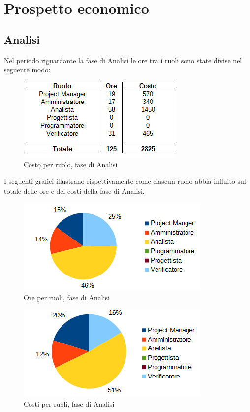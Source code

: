 \section{Prospetto economico}
	\subsection{Analisi}
	Nel periodo riguardante la fase di Analisi le ore tra i ruoli sono state divise nel seguente modo: \\
	\begin{figure}[H]
		\centering
		\includegraphics[scale=0.75]{immagini/tabelle/analisi-costo.png}
		\caption{Costo per ruolo, fase di Analisi}
	\end{figure}
	I seguenti grafici illustrano rispettivamente come ciascun ruolo abbia influito sul totale
delle ore e dei costi della fase di Analisi. \\
	\begin{figure}[H]
		\centering
		\includegraphics[scale=1]{immagini/grafici/analisi-torta.png}
		\caption{Ore per ruoli, fase di Analisi}
	\end{figure}
	\begin{figure}[H]
		\centering
		\includegraphics[scale=1]{immagini/grafici/analisi-torta-costo.png}
		\caption{Costi per ruoli, fase di Analisi}
	\end{figure}
